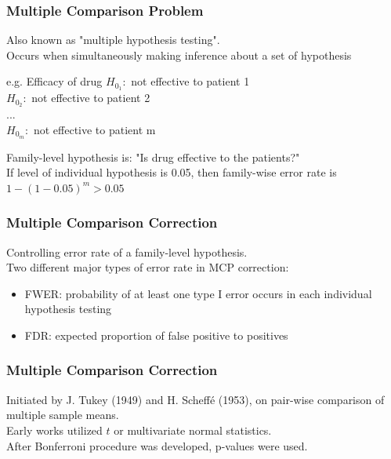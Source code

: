\documentclass{beamer}
\begin{document}
\frame
{
  \frametitle{\LARGE{Multiple Comparison Problem}}
    Also known as "multiple hypothesis testing".\vspace{0.05in}\\
    Occurs when simultaneously making inference about a set of hypothesis
    \vspace{0.2in}\\
    
    \begin{block}{e.g. Efficacy of drug}
    \center $H_{0_1}:$ not effective to patient 1\\
    $H_{0_2}:$ not effective to patient 2\\
    ...\\
    $H_{0_m}:$ not effective to patient m\vspace{0.15in}\\
    \end{block}
    
    Family-level hypothesis is: "Is drug effective to the patients?"\vspace{0.05in}\\
    If level of individual hypothesis is 0.05, then family-wise error rate is $1-(1-0.05)^m > 0.05$
}

\frame
{
  \frametitle{Multiple Comparison Correction}
    Controlling error rate of a family-level hypothesis.\vspace{0.2in}\\
    Two different major types of error rate in MCP correction:
    \begin{itemize}
      \item FWER: probability of at least one type I error occurs in each individual hypothesis testing
      \item FDR: expected proportion of false positive to positives\vspace{0.2in}\\
    \end{itemize}
}

\frame
{
  \frametitle{Multiple Comparison Correction}
    Initiated by J. Tukey (1949) and H. Scheff\'e (1953), on pair-wise comparison of multiple sample means.\vspace{0.2in}\\
    
    Early works utilized $t$ or multivariate normal statistics.\vspace{0.1in}\\
    After Bonferroni procedure was developed, p-values were used.
}
\end{document}
